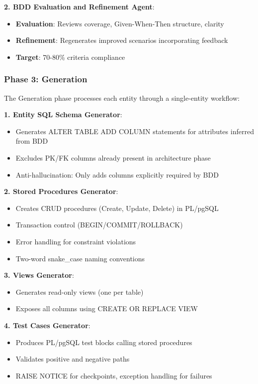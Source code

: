 \documentclass[12pt,a4paper]{article}
\begin{document}
\textbf{2. BDD Evaluation and Refinement Agent}:
\begin{itemize}
\item \textbf{Evaluation}: Reviews coverage, Given-When-Then structure, clarity
\item \textbf{Refinement}: Regenerates improved scenarios incorporating feedback
\item \textbf{Target}: 70-80\% criteria compliance
\end{itemize}

\subsubsection{Phase 3: Generation}

The Generation phase processes each entity through a single-entity workflow:

\textbf{1. Entity SQL Schema Generator}:
\begin{itemize}
\item Generates ALTER TABLE ADD COLUMN statements for attributes inferred from BDD
\item Excludes PK/FK columns already present in architecture phase
\item Anti-hallucination: Only adds columns explicitly required by BDD
\end{itemize}

\textbf{2. Stored Procedures Generator}:
\begin{itemize}
\item Creates CRUD procedures (Create, Update, Delete) in PL/pgSQL
\item Transaction control (BEGIN/COMMIT/ROLLBACK)
\item Error handling for constraint violations
\item Two-word snake\_case naming conventions
\end{itemize}

\textbf{3. Views Generator}:
\begin{itemize}
\item Generates read-only views (one per table)
\item Exposes all columns using CREATE OR REPLACE VIEW
\end{itemize}

\textbf{4. Test Cases Generator}:
\begin{itemize}
\item Produces PL/pgSQL test blocks calling stored procedures
\item Validates positive and negative paths
\item RAISE NOTICE for checkpoints, exception handling for failures
\end{itemize}
\end{document}
